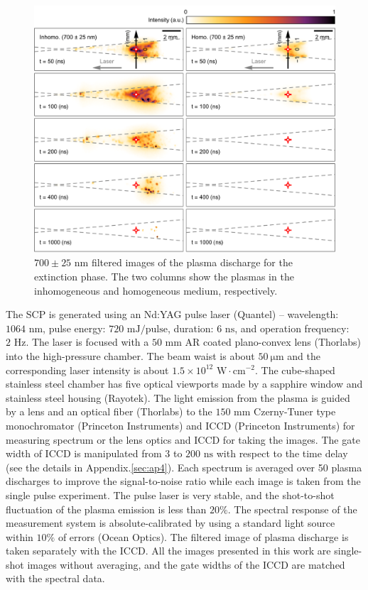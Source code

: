 \begin{figure}[ht!]
\centering
\includegraphics[width=130mm]{figures/ch4/imaging/700ext.pdf}
\caption{$700\pm25 \text{ nm}$ filtered images of the plasma discharge for the extinction phase. The two columns show the plasmas in the inhomogeneous and homogeneous medium, respectively.}
\label{fig:700ext}
\end{figure}

The SCP is generated using an Nd:YAG pulse laser (Quantel) –  wavelength: $1064 \text{ nm}$, pulse energy: $720 \text{ mJ/pulse}$, duration: $6 \text{ ns}$, and operation frequency: $2 \text{ Hz}$. The laser is focused with a $50 \text{ mm}$ AR coated plano-convex lens (Thorlabs) into the high-pressure chamber. The beam waist is about $50 ~\mathrm{\mu}\text{m}$ and the corresponding laser intensity is about $1.5 \times 10^{12} \text{ W}\cdot\text{cm}^{-2}$. The cube-shaped stainless steel chamber has five optical viewports made by a sapphire window and stainless steel housing (Rayotek). The light emission from the plasma is guided by a lens and an optical fiber (Thorlabs) to the $150 \text{ mm}$ Czerny-Tuner type monochromator (Princeton Instruments) and ICCD (Princeton Instruments) for measuring spectrum or the lens optics and ICCD for taking the images. The gate width of ICCD is manipulated from $3$ to $200 \text{ ns}$ with respect to the time delay (see the details in Appendix.\ref{sec:ap4}). Each spectrum is averaged over 50 plasma discharges to improve the signal-to-noise ratio while each image is taken from the single pulse experiment. The pulse laser is very stable, and the shot-to-shot fluctuation of the plasma emission is less than $20\%$. The spectral response of the measurement system is absolute-calibrated by using a standard light source within $10\%$ of errors (Ocean Optics). The filtered image of plasma discharge is taken separately with the ICCD. All the images presented in this work are single-shot images without averaging, and the gate widths of the ICCD are matched with the spectral data.



